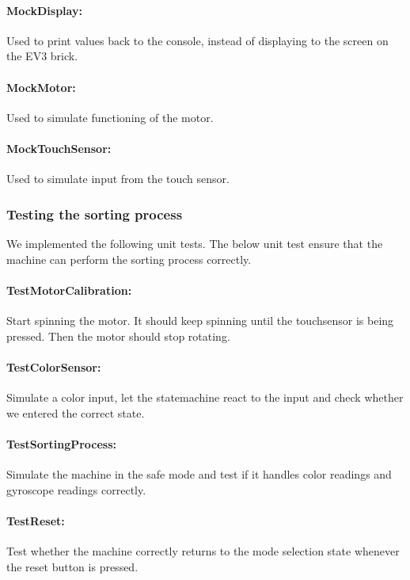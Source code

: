 \documentclass[a4paper,oneside,11pt]{article}
\begin{document}
\paragraph{MockDisplay:} Used to print values back to the console, instead of displaying to the screen on the EV3 brick.

\paragraph{MockMotor:} Used to simulate functioning of the motor.

\paragraph{MockTouchSensor:} Used to simulate input from the touch sensor. 

\subsubsection{Testing the sorting process}
We implemented the following unit tests. The below unit test ensure that the machine can perform the sorting process correctly.

\paragraph{TestMotorCalibration:} Start spinning the motor. It should keep spinning until the touchsensor is being pressed. Then the motor should stop rotating.

\paragraph{TestColorSensor:} Simulate a color input, let the statemachine react to the input and check whether we entered the correct state.

\paragraph{TestSortingProcess:} Simulate the machine in the safe mode and test if it handles color readings and gyroscope readings correctly.

\paragraph{TestReset:} Test whether the machine correctly returns to the mode selection state whenever the reset button is pressed.
\end{document}
